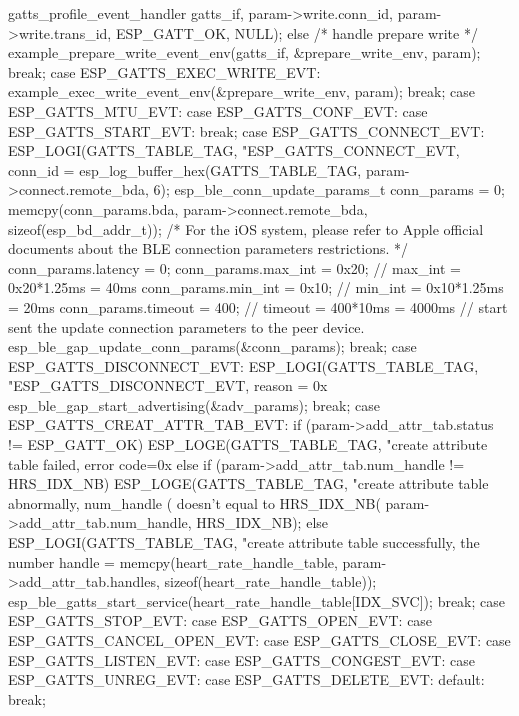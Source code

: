 \documentclass[lang=cn,newtx,10pt,scheme=chinese]{elegantbook}
\begin{document}
\begin{mycode}{gatts\_profile\_event\_handler}
{{{{                    gatts_if,
                    param->write.conn_id,
                    param->write.trans_id,
                    ESP_GATT_OK,
                    NULL);
            }
        }
        else
        {
            /* handle prepare write */
            example_prepare_write_event_env(gatts_if, &prepare_write_env, param);
        }
        break;
    case ESP_GATTS_EXEC_WRITE_EVT:
        example_exec_write_event_env(&prepare_write_env, param);
        break;
    case ESP_GATTS_MTU_EVT:
    case ESP_GATTS_CONF_EVT:
    case ESP_GATTS_START_EVT:
        break;
    case ESP_GATTS_CONNECT_EVT:
        ESP_LOGI(GATTS_TABLE_TAG, "ESP_GATTS_CONNECT_EVT, conn_id = %
        esp_log_buffer_hex(GATTS_TABLE_TAG, param->connect.remote_bda, 6);
        esp_ble_conn_update_params_t conn_params = {0};
        memcpy(conn_params.bda, param->connect.remote_bda, sizeof(esp_bd_addr_t));
        /* For the iOS system, please refer to Apple official documents about the BLE connection parameters restrictions. */
        conn_params.latency = 0;
        conn_params.max_int = 0x20; // max_int = 0x20*1.25ms = 40ms
        conn_params.min_int = 0x10; // min_int = 0x10*1.25ms = 20ms
        conn_params.timeout = 400;  // timeout = 400*10ms = 4000ms
        // start sent the update connection parameters to the peer device.
        esp_ble_gap_update_conn_params(&conn_params);
        break;
    case ESP_GATTS_DISCONNECT_EVT:
        ESP_LOGI(GATTS_TABLE_TAG, "ESP_GATTS_DISCONNECT_EVT, reason = 0x%
        esp_ble_gap_start_advertising(&adv_params);
        break;
    case ESP_GATTS_CREAT_ATTR_TAB_EVT:
    {
        if (param->add_attr_tab.status != ESP_GATT_OK)
        {
            ESP_LOGE(GATTS_TABLE_TAG, "create attribute table failed, error code=0x%
        }
        else if (param->add_attr_tab.num_handle != HRS_IDX_NB)
        {
            ESP_LOGE(GATTS_TABLE_TAG, "create attribute table abnormally, num_handle (%
                        doesn't equal to HRS_IDX_NB(%
                     param->add_attr_tab.num_handle, HRS_IDX_NB);
        }
        else
        {
            ESP_LOGI(GATTS_TABLE_TAG, "create attribute table successfully, the number handle = %
            memcpy(heart_rate_handle_table, param->add_attr_tab.handles, sizeof(heart_rate_handle_table));
            esp_ble_gatts_start_service(heart_rate_handle_table[IDX_SVC]);
        }
        break;
    }
    case ESP_GATTS_STOP_EVT:
    case ESP_GATTS_OPEN_EVT:
    case ESP_GATTS_CANCEL_OPEN_EVT:
    case ESP_GATTS_CLOSE_EVT:
    case ESP_GATTS_LISTEN_EVT:
    case ESP_GATTS_CONGEST_EVT:
    case ESP_GATTS_UNREG_EVT:
    case ESP_GATTS_DELETE_EVT:
    default:
        break;
    }
}
\end{mycode}
\end{document}
